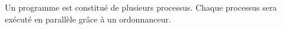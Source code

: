 Un programme est constitué de plusieurs processus. Chaque processus sera exécuté en parallèle grâce à un ordonnanceur.

% 
% 
% 
% 
% 

